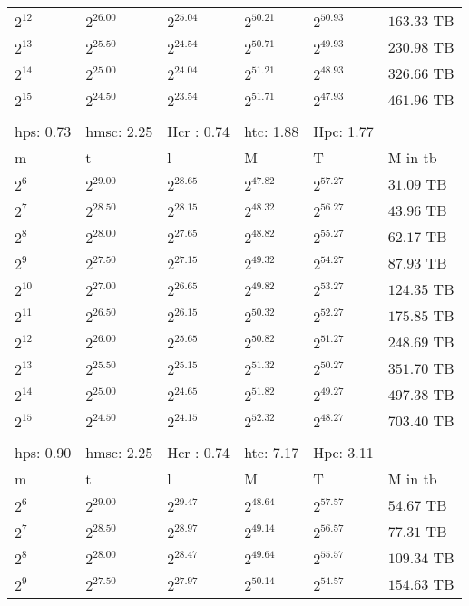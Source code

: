 \begin{tabular}{llllll}
$2^{12}$ & $2^{26.00}$ & $2^{25.04}$ & $2^{50.21}$ & $2^{50.93}$ & $163.33$ TB \\
$2^{13}$ & $2^{25.50}$ & $2^{24.54}$ & $2^{50.71}$ & $2^{49.93}$ & $230.98$ TB \\
$2^{14}$ & $2^{25.00}$ & $2^{24.04}$ & $2^{51.21}$ & $2^{48.93}$ & $326.66$ TB \\
$2^{15}$ & $2^{24.50}$ & $2^{23.54}$ & $2^{51.71}$ & $2^{47.93}$ & $461.96$ TB \\
 &  &  &  &  &  \\
hps: 0.73 & hmsc: 2.25 & Hcr : 0.74 & htc: 1.88 & Hpc: 1.77 &  \\
m & t & l & M & T & M in tb \\
$2^{6}$ & $2^{29.00}$ & $2^{28.65}$ & $2^{47.82}$ & $2^{57.27}$ & $31.09$ TB \\
$2^{7}$ & $2^{28.50}$ & $2^{28.15}$ & $2^{48.32}$ & $2^{56.27}$ & $43.96$ TB \\
$2^{8}$ & $2^{28.00}$ & $2^{27.65}$ & $2^{48.82}$ & $2^{55.27}$ & $62.17$ TB \\
$2^{9}$ & $2^{27.50}$ & $2^{27.15}$ & $2^{49.32}$ & $2^{54.27}$ & $87.93$ TB \\
$2^{10}$ & $2^{27.00}$ & $2^{26.65}$ & $2^{49.82}$ & $2^{53.27}$ & $124.35$ TB \\
$2^{11}$ & $2^{26.50}$ & $2^{26.15}$ & $2^{50.32}$ & $2^{52.27}$ & $175.85$ TB \\
$2^{12}$ & $2^{26.00}$ & $2^{25.65}$ & $2^{50.82}$ & $2^{51.27}$ & $248.69$ TB \\
$2^{13}$ & $2^{25.50}$ & $2^{25.15}$ & $2^{51.32}$ & $2^{50.27}$ & $351.70$ TB \\
$2^{14}$ & $2^{25.00}$ & $2^{24.65}$ & $2^{51.82}$ & $2^{49.27}$ & $497.38$ TB \\
$2^{15}$ & $2^{24.50}$ & $2^{24.15}$ & $2^{52.32}$ & $2^{48.27}$ & $703.40$ TB \\
 &  &  &  &  &  \\
hps: 0.90 & hmsc: 2.25 & Hcr : 0.74 & htc: 7.17 & Hpc: 3.11 &  \\
m & t & l & M & T & M in tb \\
$2^{6}$ & $2^{29.00}$ & $2^{29.47}$ & $2^{48.64}$ & $2^{57.57}$ & $54.67$ TB \\
$2^{7}$ & $2^{28.50}$ & $2^{28.97}$ & $2^{49.14}$ & $2^{56.57}$ & $77.31$ TB \\
$2^{8}$ & $2^{28.00}$ & $2^{28.47}$ & $2^{49.64}$ & $2^{55.57}$ & $109.34$ TB \\
$2^{9}$ & $2^{27.50}$ & $2^{27.97}$ & $2^{50.14}$ & $2^{54.57}$ & $154.63$ TB \\

\end{tabular}
